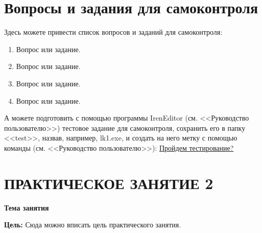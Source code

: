 

\section*{Вопросы и задания для самоконтроля}%

Здесь можете привести список вопросов и заданий для самоконтроля:
\begin{enumerate}%
\item Вопрос или задание.
\item Вопрос или задание.
\item Вопрос или задание.
\item Вопрос или задание.
\end{enumerate}%

А можете подготовить с помощью программы IrenEditor (см. <<Руководство пользователю>>)
тестовое задание для самоконтроля, сохранить его в папку
<<test>>, назвав, например, lk1.exe, и создать на него метку с помощью
команды (см. <<Руководство пользователю>>): \href{run:test/lk1.exe}{Пройдем тестирование?}

\newpage%
\section*{ПРАКТИЧЕСКОЕ ЗАНЯТИЕ 2}%
 \vspace{-10pt}%
\begin{center}%
 {\bf%
 Тема занятия}
\end{center}%

{\bf Цель:} Сюда можно вписать цель практического занятия.
\\%


